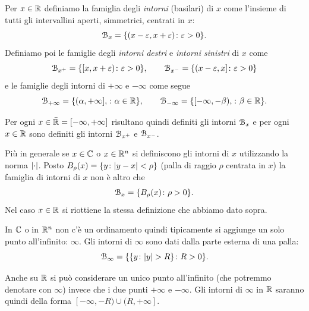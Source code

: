 \begin{definition}[intorno]
Per $x\in {\mathbb R}$ definiamo la famiglia degli \emph{intorni}%
%
 (basilari) di $x$
come l'insieme di tutti gli intervallini aperti, simmetrici, centrati in $x$:
\[
  \mathcal B_x = {\left\{  (x-\varepsilon, x+\varepsilon) \colon \varepsilon>0 \right\}}.
\]
Definiamo poi le famiglie 
degli \emph{intorni destri} e \emph{intorni sinistri}
%
di $x$ come
\[
  \mathcal B_{x^+} = {\left\{  [x, x+\varepsilon) \colon \varepsilon>0 \right\}},
  \qquad
  \mathcal B_{x^-} = {\left\{  (x-\varepsilon , x] \colon \varepsilon>0 \right\}}
\]
e le famiglie degli intorni di $+\infty$ e $-\infty$ come segue
\[
  \mathcal B_{+\infty} = {\left\{  (\alpha,+\infty], \colon \alpha \in {\mathbb R}  \right\}},\qquad
  \mathcal B_{-\infty} = {\left\{  [-\infty, -\beta), \colon \beta\in {\mathbb R} \right\}}.
\]

Per ogni $x\in \bar {{\mathbb R}} = [-\infty, +\infty]$
risultano quindi definiti gli intorni $\mathcal B_x$ e per
ogni $x\in {\mathbb R}$ sono definiti gli intorni $\mathcal B_{x^+}$ e $\mathcal B_{x^-}$.

Più in generale se $x\in {\mathbb C}$ o $x\in {\mathbb R}^n$
si definiscono gli intorni di $x$ 
utilizzando la norma ${\left|\cdot\right|}$.
Posto $B_\rho(x) = {\left\{ y\colon {\left|y-x\right|}<\rho \right\}}$
(palla di raggio $\rho$ centrata in $x$)
la famiglia di intorni di $x$ non è altro che
\[
  \mathcal B_x = {\left\{ B_\rho(x)\colon \rho>0 \right\}}.
\]
Nel caso $x\in {\mathbb R}$ si riottiene la stessa definizione che 
abbiamo dato sopra.

In ${\mathbb C}$ o in ${\mathbb R}^n$ non c'è un ordinamento quindi 
tipicamente si aggiunge un solo punto all'infinito: $\infty$.
Gli intorni di $\infty$
sono dati dalla parte esterna di una palla:
\[
  \mathcal B_\infty = {\left\{ {\left\{ y\colon {\left|y\right|}> R \right\}}\colon R>0 \right\}}.
\]

Anche su ${\mathbb R}$ si può considerare un unico punto 
all'infinito (che potremmo denotare con $\infty$)
invece che i due punti $+\infty$ e $-\infty$. 
Gli intorni di $\infty$ in ${\mathbb R}$ saranno quindi della forma $[-\infty,-R) \cup (R,+\infty]$.
\end{definition}


